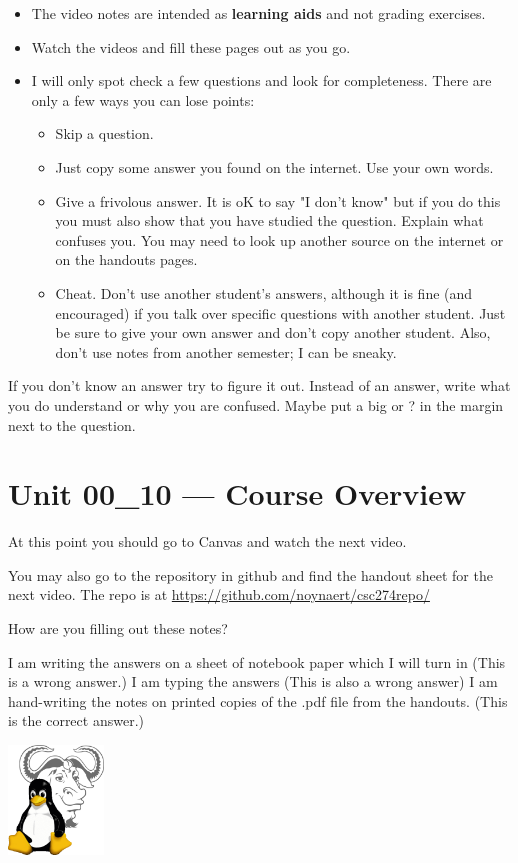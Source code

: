 \documentclass[letterpaper,12pt]{exam}
\begin{document}
  \begin{itemize}
	\item The video notes are intended as \textbf{learning aids} and not grading exercises.
	\item Watch the videos and fill these pages out as you go.
	\item I will only spot check a few questions and look for completeness.  There are only a few ways you can lose points:
	   \begin{itemize}
	     \item Skip a question. 
		 \item Just copy some answer you found on the internet.  Use your own words.
	     \item Give a frivolous answer.  It is oK to say "I don't know" but if you do this you must also show that you have studied the question.  Explain what confuses you.  You may need to look up another source on the internet or on the handouts pages.
	     \item Cheat.  Don't use another student's answers, although it is fine (and encouraged) if you talk over specific questions with another student.  Just be sure to give your own answer and don't copy another student.  Also, don't use notes from another semester; I can be sneaky.
	   \end{itemize}
	\end{itemize}

If you don't know an answer try to figure it out.  Instead of an answer,
write what you do understand or why you are confused.  Maybe put a big \textcolor{BrickRed}{\Huge*} or \textcolor{BrickRed}{\Huge?} in the margin next to 
the question.

   
\section*{Unit 00\_10 --- Course Overview}

\begin{center}
At this point you should go to Canvas and watch the next video.

You may also go to the repository in github and find the handout sheet for the next video.  
The repo is at \url{https://github.com/noynaert/csc274repo/}
\end{center}
\begin{questions}
\question How are you filling out these notes?
\begin{checkboxes}
\choice I am writing the answers on a sheet of notebook paper which I will turn in (This is a wrong answer.)
\choice I am typing the answers (This is also a wrong answer)
\choice I am hand-writing the notes on printed copies of the .pdf file from the handouts. (This is the correct answer.)
\end{checkboxes}
\end{questions}

\includegraphics[width=1in]{tux}\label{end}
\end{document}

